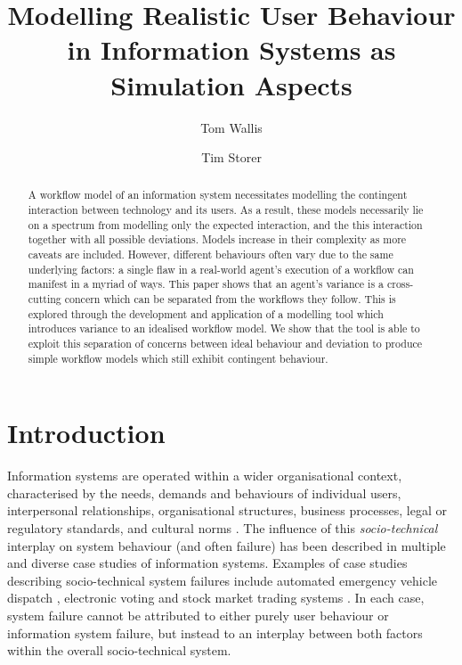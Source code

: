 \documentclass{llncs}
\title{Modelling Realistic User Behaviour in Information Systems as Simulation Aspects}
\author{Tom Wallis\orcidID{} \and Tim Storer\orcidID{}}
\institute{University of Glasgow, Glasgow, Scotland,\\
  \email{w.wallis.1@research.gla.ac.uk},\\
  \email{timothy.storer@glasgow.ac.uk},
}
\begin{document}

\maketitle


\begin{abstract}
A workflow model of an information system necessitates modelling the contingent interaction between technology and its 
users. As a result, these models necessarily lie on a spectrum from modelling only the expected interaction, and the 
this interaction together with all possible deviations. Models increase in their complexity as more caveats are 
included.
However, different behaviours often vary due to the same underlying factors: a single flaw in a real-world agent's 
execution of a workflow can manifest in a myriad of ways. This paper shows that an agent's variance is a cross-cutting
concern which can be separated from the workflows they follow. This is explored through the development and application
of a modelling tool which introduces variance to an idealised workflow model. We show that the tool is able to exploit 
this separation of concerns between ideal behaviour and deviation to produce simple workflow models which still exhibit 
contingent behaviour.
\end{abstract}


\section{Introduction}
\label{sec:introduction}


Information systems are operated within a wider organisational context, characterised by the needs, demands and
behaviours of individual users, interpersonal relationships, organisational structures, business processes, legal or
regulatory standards, and cultural norms \citep{susman1976autonomy,bade07structures,pentland05organisational}.  The
influence of this \emph{socio-technical} interplay on system behaviour (and often failure) has been described in
multiple and diverse case studies of information systems.  Examples of case studies describing socio-technical system
failures include automated emergency vehicle dispatch \citep{robinson96limited}, electronic voting
\citep{lock07observations} and stock market trading systems \citet{cftc-sec10findings}. In each case, system failure
cannot be attributed to either purely user behaviour or information system failure, but instead to an interplay between
both factors within the overall socio-technical system.
\end{document}
